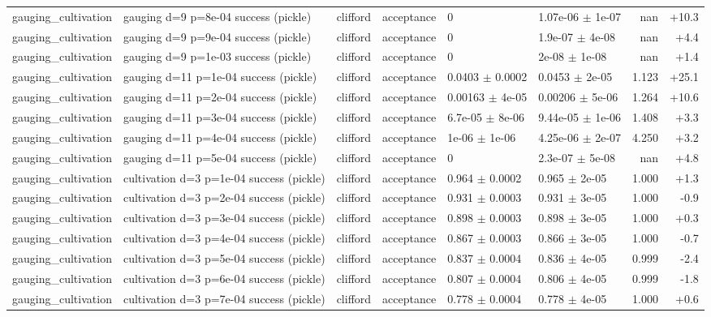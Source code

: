 \documentclass[10pt]{article}
\begin{document}
{\begin{longtable}{l l l l l l r r}
gauging\_cultivation & gauging d=9 p=8e-04 success (pickle) & clifford & acceptance & 0 & 1.07e-06 $\pm$ 1e-07 & nan & +10.3 \\
gauging\_cultivation & gauging d=9 p=9e-04 success (pickle) & clifford & acceptance & 0 & 1.9e-07 $\pm$ 4e-08 & nan & +4.4 \\
gauging\_cultivation & gauging d=9 p=1e-03 success (pickle) & clifford & acceptance & 0 & 2e-08 $\pm$ 1e-08 & nan & +1.4 \\
gauging\_cultivation & gauging d=11 p=1e-04 success (pickle) & clifford & acceptance & 0.0403 $\pm$ 0.0002 & 0.0453 $\pm$ 2e-05 & 1.123 & +25.1 \\
gauging\_cultivation & gauging d=11 p=2e-04 success (pickle) & clifford & acceptance & 0.00163 $\pm$ 4e-05 & 0.00206 $\pm$ 5e-06 & 1.264 & +10.6 \\
gauging\_cultivation & gauging d=11 p=3e-04 success (pickle) & clifford & acceptance & 6.7e-05 $\pm$ 8e-06 & 9.44e-05 $\pm$ 1e-06 & 1.408 & +3.3 \\
gauging\_cultivation & gauging d=11 p=4e-04 success (pickle) & clifford & acceptance & 1e-06 $\pm$ 1e-06 & 4.25e-06 $\pm$ 2e-07 & 4.250 & +3.2 \\
gauging\_cultivation & gauging d=11 p=5e-04 success (pickle) & clifford & acceptance & 0 & 2.3e-07 $\pm$ 5e-08 & nan & +4.8 \\
gauging\_cultivation & cultivation d=3 p=1e-04 success (pickle) & clifford & acceptance & 0.964 $\pm$ 0.0002 & 0.965 $\pm$ 2e-05 & 1.000 & +1.3 \\
gauging\_cultivation & cultivation d=3 p=2e-04 success (pickle) & clifford & acceptance & 0.931 $\pm$ 0.0003 & 0.931 $\pm$ 3e-05 & 1.000 & -0.9 \\
gauging\_cultivation & cultivation d=3 p=3e-04 success (pickle) & clifford & acceptance & 0.898 $\pm$ 0.0003 & 0.898 $\pm$ 3e-05 & 1.000 & +0.3 \\
gauging\_cultivation & cultivation d=3 p=4e-04 success (pickle) & clifford & acceptance & 0.867 $\pm$ 0.0003 & 0.866 $\pm$ 3e-05 & 1.000 & -0.7 \\
gauging\_cultivation & cultivation d=3 p=5e-04 success (pickle) & clifford & acceptance & 0.837 $\pm$ 0.0004 & 0.836 $\pm$ 4e-05 & 0.999 & -2.4 \\
gauging\_cultivation & cultivation d=3 p=6e-04 success (pickle) & clifford & acceptance & 0.807 $\pm$ 0.0004 & 0.806 $\pm$ 4e-05 & 0.999 & -1.8 \\
gauging\_cultivation & cultivation d=3 p=7e-04 success (pickle) & clifford & acceptance & 0.778 $\pm$ 0.0004 & 0.778 $\pm$ 4e-05 & 1.000 & +0.6 \\

\end{longtable}}
\end{document}
